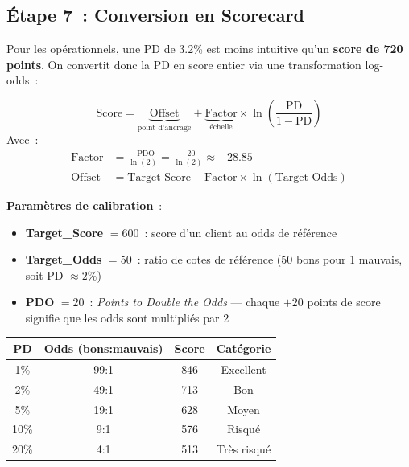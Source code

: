 \documentclass[12pt,a4paper]{article}
\begin{document}
\subsection{\'Etape 7~: Conversion en Scorecard}

Pour les op\'erationnels, une PD de 3.2\% est moins intuitive qu'un \textbf{score de 720 points}. On convertit donc la PD en score entier via une transformation log-odds~:

\begin{formulebox}
\begin{equation}
    \text{Score} = \underbrace{\text{Offset}}_{\text{point d'ancrage}} + \underbrace{\text{Factor}}_{\text{\'echelle}} \times \ln\left(\frac{\text{PD}}{1 - \text{PD}}\right)
    \label{eq:score}
\end{equation}
Avec~:
\begin{align}
    \text{Factor} &= \frac{-\text{PDO}}{\ln(2)} = \frac{-20}{\ln(2)} \approx -28.85 \label{eq:factor} \\
    \text{Offset} &= \text{Target\_Score} - \text{Factor} \times \ln(\text{Target\_Odds}) \label{eq:offset}
\end{align}
\end{formulebox}

\textbf{Param\`etres de calibration}~:
\begin{itemize}[noitemsep]
    \item \textbf{Target\_Score} $= 600$~: score d'un client au odds de r\'ef\'erence
    \item \textbf{Target\_Odds} $= 50$~: ratio de cotes de r\'ef\'erence (50 bons pour 1 mauvais, soit PD $\approx 2\%$)
    \item \textbf{PDO} $= 20$~: \textit{Points to Double the Odds} --- chaque $+20$ points de score signifie que les odds sont multipli\'es par 2
\end{itemize}

\begin{center}
\begin{tabular}{cccc}
\toprule
\textbf{PD} & \textbf{Odds (bons:mauvais)} & \textbf{Score} & \textbf{Cat\'egorie} \\
\midrule
1\% & 99:1 & 846 & Excellent \\
2\% & 49:1 & 713 & Bon \\
5\% & 19:1 & 628 & Moyen \\
10\% & 9:1 & 576 & Risqu\'e \\
20\% & 4:1 & 513 & Tr\`es risqu\'e \\
\bottomrule
\end{tabular}
\end{center}
\end{document}
